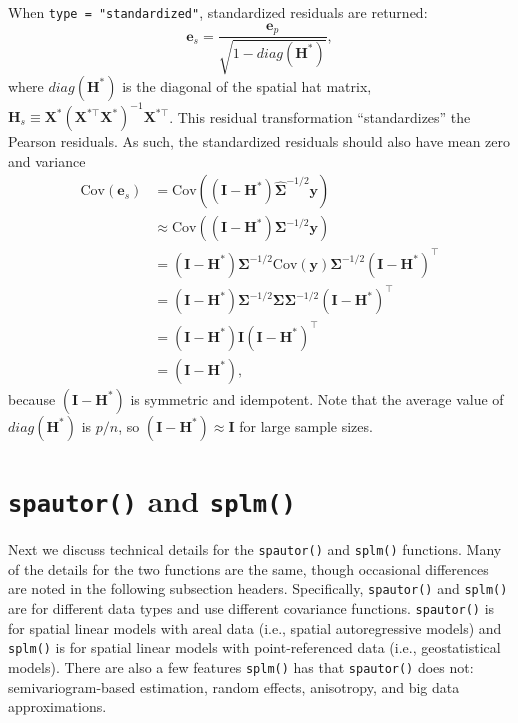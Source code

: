 \documentclass{article}
\begin{document}
When \texttt{type\ =\ "standardized"}, standardized residuals are
returned: \begin{equation*}
 \mathbf{e}_{s} = \frac{\mathbf{e}_{p}}{\sqrt{1 - diag(\mathbf{H}^*)}},
\end{equation*} where \(diag(\mathbf{H}^*)\) is the diagonal of the
spatial hat matrix,
\(\mathbf{H}_s \equiv \mathbf{X}^* (\mathbf{X}^{* \top} \mathbf{X}^*)^{-1} \mathbf{X}^{* \top}\).
This residual transformation ``standardizes'' the Pearson residuals. As
such, the standardized residuals should also have mean zero and variance
\begin{equation*}
  \begin{split}
  \text{Cov}(\mathbf{e}_{s}) & = \text{Cov}((\mathbf{I} - \mathbf{H}^*) \hat{\boldsymbol{\Sigma}}^{-1/2}\mathbf{y}) \\
  & \approx \text{Cov}((\mathbf{I} - \mathbf{H}^*) \boldsymbol{\Sigma}^{-1/2}\mathbf{y}) \\
  & = (\mathbf{I} - \mathbf{H}^*) \boldsymbol{\Sigma}^{-1/2} \text{Cov}(\mathbf{y}) \boldsymbol{\Sigma}^{-1/2}(\mathbf{I} - \mathbf{H}^*)^\top \\
  & = (\mathbf{I} - \mathbf{H}^*) \boldsymbol{\Sigma}^{-1/2} \boldsymbol{\Sigma} \boldsymbol{\Sigma}^{-1/2}(\mathbf{I} - \mathbf{H}^*)^\top \\
  & = (\mathbf{I} - \mathbf{H}^*) \mathbf{I} (\mathbf{I} - \mathbf{H}^*)^\top \\
  & = (\mathbf{I} - \mathbf{H}^*),
  \end{split}
\end{equation*} because \((\mathbf{I} - \mathbf{H}^*)\) is symmetric and
idempotent. Note that the average value of \(diag(\mathbf{H}^*)\) is
\(p / n\), so \((\mathbf{I} - \mathbf{H}^*) \approx \mathbf{I}\) for
large sample sizes.

\hypertarget{sec:spmod}{%
\section{\texorpdfstring{\texttt{spautor()} and
\texttt{splm()}}{spautor() and splm()}}\label{sec:spmod}}

Next we discuss technical details for the \texttt{spautor()} and
\texttt{splm()} functions. Many of the details for the two functions are
the same, though occasional differences are noted in the following
subsection headers. Specifically, \texttt{spautor()} and \texttt{splm()}
are for different data types and use different covariance functions.
\texttt{spautor()} is for spatial linear models with areal data (i.e.,
spatial autoregressive models) and \texttt{splm()} is for spatial linear
models with point-referenced data (i.e., geostatistical models). There
are also a few features \texttt{splm()} has that \texttt{spautor()} does
not: semivariogram-based estimation, random effects, anisotropy, and big
data approximations.
\end{document}
